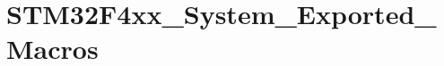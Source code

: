 \hypertarget{group___s_t_m32_f4xx___system___exported___macros}{\section{S\-T\-M32\-F4xx\-\_\-\-System\-\_\-\-Exported\-\_\-\-Macros}
\label{group___s_t_m32_f4xx___system___exported___macros}
}
